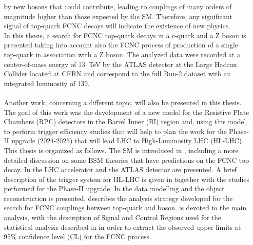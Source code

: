 by new bosons that could contribute, leading to couplings of many orders of magnitude higher
than those expected by the SM.
Therefore, any significant signal of top-quark FCNC decays will indicate the existence of new physics.
\vspace{\baselineskip}
\\In this thesis, a search for FCNC top-quark decays in a c-quark and a Z boson is presented taking into 
account also the FCNC process of production of a single top-quark in association with a Z boson.
The analyzed data were recorded at a center-of-mass energy of \SI{13}{\TeV} by the ATLAS detector at 
the Large Hadron Collider located at CERN and correspond to the full Run-2 dataset 
with an integrated luminosity of \SI{139}{\ifb}.\\
\vspace{\baselineskip}
\\Another work, concerning a different topic, will also be presented in this thesis. \\ 
The goal of this work was the development of a new model for the Resistive Plate Chambers (RPC) detectors in the Barrel Inner (BI) region and, using this model, to perform trigger efficiency studies that will help to plan the work for the Phase-II upgrade (2024-2025) that will lead LHC to High-Luminosity LHC (HL-LHC).
\vspace{\baselineskip}
\\This thesis is organized as follows. The SM is introduced in  , including a
more detailed discussion on some BSM theories that have predictions on the FCNC top decay. 
In  the LHC accelerator and the ATLAS detector are presented. 
A brief description of the trigger system for HL-LHC is given in  together with the studies performed for the Phase-II upgrade. 
In   the data modelling and the object reconstruction is presented.
 describes the analysis strategy developed for the search for FCNC couplings between top-quark and \PZ boson.  is devoted to the main analysis, with the description of Signal and Control Regions used for the statistical analysis described in  in order to extract the observed upper limits at 95\% confidence level (CL) for the FCNC \tZc process.
 
 